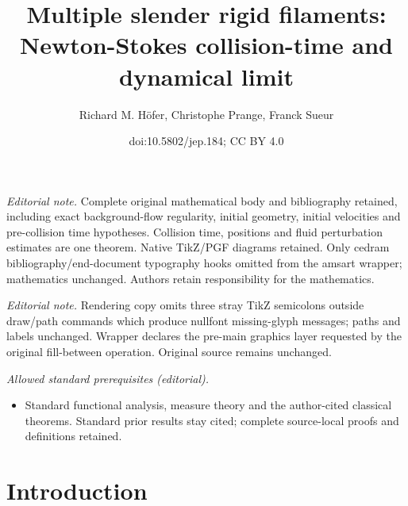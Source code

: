 \documentclass[10pt]{amsart}
\title{Multiple slender rigid filaments: Newton-Stokes collision-time and dynamical limit}
\author{Richard M. Höfer, Christophe Prange, Franck Sueur}
\date{doi:10.5802/jep.184; CC BY 4.0}
\theoremstyle{definition}
\theoremstyle{remark}
\providecommand{\mainmatter}{}\providecommand{\backmatter}{}
\begin{document}
\maketitle
\noindent\textit{Editorial note.} Complete original mathematical body and bibliography retained, including exact background-flow regularity, initial geometry, initial velocities and pre-collision time hypotheses. Collision time, positions and fluid perturbation estimates are one theorem. Native TikZ/PGF diagrams retained. Only cedram bibliography/end-document typography hooks omitted from the amsart wrapper; mathematics unchanged. Authors retain responsibility for the mathematics.\par\medskip
\noindent\textit{Editorial note.} Rendering copy omits three stray TikZ semicolons outside draw/path commands which produce nullfont missing-glyph messages; paths and labels unchanged. Wrapper declares the pre-main graphics layer requested by the original fill-between operation. Original source remains unchanged.\par\medskip
\noindent\textit{Allowed standard prerequisites (editorial).}\begin{itemize}
\item Standard functional analysis, measure theory and the author-cited classical theorems. Standard prior results stay cited; complete source-local proofs and definitions retained.
\end{itemize}\medskip
\tableofcontents
\mainmatter

\vspace*{-\baselineskip}\vskip0pt
\section{Introduction}
\label{sec-intro}
\end{document}
